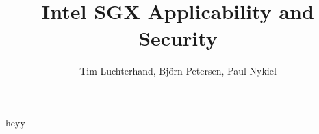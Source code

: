 \documentclass[vspaper,language=english]{acmart} %
\begin{document}
\title{Intel SGX Applicability and Security}

\author{Tim Luchterhand, Björn Petersen, Paul Nykiel} 

\begin{abstract}
    
\end{abstract}
\maketitle
{}



heyy

\appendix
{}


\end{document}
